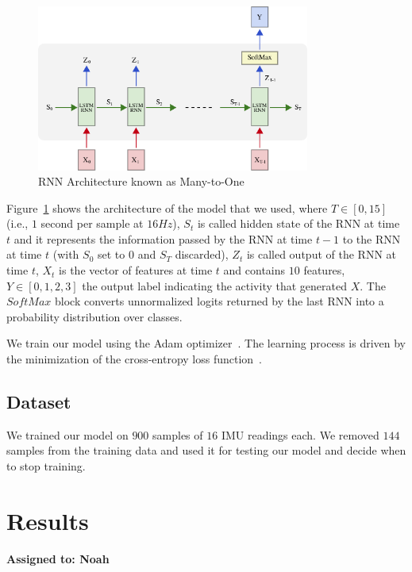 \documentclass{article}
\begin{document}
\begin{figure}[t]
    \centering
    \vspace{-8pt}
    \includegraphics[width=0.8\textwidth]{figures/rnn_full}
    \caption{RNN Architecture known as Many-to-One \label{fig:rnn_architecture}}
    \vspace{-6pt}
\end{figure}

Figure~\ref{fig:rnn_architecture} shows the architecture of the model that we used, where
$T \in [0,15]$ (i.e., $1$ second per sample at $16Hz$), $S_t$ is called hidden state of the
RNN at time $t$ and it represents the information passed by the RNN at time $t-1$ to the RNN
at time $t$ (with $S_0$ set to $0$ and $S_T$ discarded), $Z_t$ is called output of the RNN
at time $t$, $X_t$ is the vector of features at time $t$ and contains $10$ features,
$Y \in [0,1,2,3]$ the output label indicating the activity that generated $X$.
The $SoftMax$ block converts
unnormalized logits returned by the last RNN into a probability distribution over classes.

We train our model using the Adam optimizer~\cite{kingma2014adam}.
The learning process is driven by the minimization of the cross-entropy loss
function~\cite{rubinstein1999cross}.

\subsection{Dataset}
\vspace{-.2cm}

We trained our model on $900$ samples of $16$ IMU readings each. We removed $144$ samples
from the training data and used it for testing our model and decide when to stop training.


\section{Results}
\vspace{-.3cm}
\textbf{Assigned to: Noah}
\end{document}
